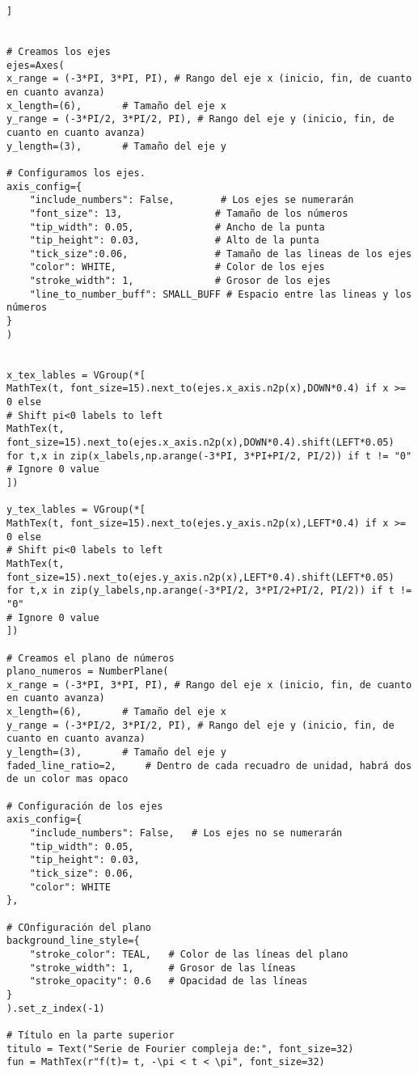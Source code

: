 \begin{longlisting}
\begin{verbatim}
]


# Creamos los ejes
ejes=Axes(
x_range = (-3*PI, 3*PI, PI), # Rango del eje x (inicio, fin, de cuanto en cuanto avanza)
x_length=(6),       # Tamaño del eje x
y_range = (-3*PI/2, 3*PI/2, PI), # Rango del eje y (inicio, fin, de cuanto en cuanto avanza)
y_length=(3),       # Tamaño del eje y

# Configuramos los ejes.
axis_config={
	"include_numbers": False,        # Los ejes se numerarán
	"font_size": 13,                # Tamaño de los números
	"tip_width": 0.05,              # Ancho de la punta
	"tip_height": 0.03,             # Alto de la punta
	"tick_size":0.06,               # Tamaño de las lineas de los ejes
	"color": WHITE,                 # Color de los ejes
	"stroke_width": 1,              # Grosor de los ejes
	"line_to_number_buff": SMALL_BUFF # Espacio entre las lineas y los números
}       
)


x_tex_lables = VGroup(*[
MathTex(t, font_size=15).next_to(ejes.x_axis.n2p(x),DOWN*0.4) if x >= 0 else
# Shift pi<0 labels to left
MathTex(t, font_size=15).next_to(ejes.x_axis.n2p(x),DOWN*0.4).shift(LEFT*0.05)
for t,x in zip(x_labels,np.arange(-3*PI, 3*PI+PI/2, PI/2)) if t != "0"
# Ignore 0 value
])

y_tex_lables = VGroup(*[
MathTex(t, font_size=15).next_to(ejes.y_axis.n2p(x),LEFT*0.4) if x >= 0 else
# Shift pi<0 labels to left
MathTex(t, font_size=15).next_to(ejes.y_axis.n2p(x),LEFT*0.4).shift(LEFT*0.05)
for t,x in zip(y_labels,np.arange(-3*PI/2, 3*PI/2+PI/2, PI/2)) if t != "0"
# Ignore 0 value
])

# Creamos el plano de números
plano_numeros = NumberPlane(
x_range = (-3*PI, 3*PI, PI), # Rango del eje x (inicio, fin, de cuanto en cuanto avanza)
x_length=(6),       # Tamaño del eje x
y_range = (-3*PI/2, 3*PI/2, PI), # Rango del eje y (inicio, fin, de cuanto en cuanto avanza)
y_length=(3),       # Tamaño del eje y
faded_line_ratio=2,     # Dentro de cada recuadro de unidad, habrá dos de un color mas opaco

# Configuración de los ejes
axis_config={
	"include_numbers": False,   # Los ejes no se numerarán
	"tip_width": 0.05, 
	"tip_height": 0.03, 
	"tick_size": 0.06, 
	"color": WHITE
},

# COnfiguración del plano
background_line_style={
	"stroke_color": TEAL,   # Color de las líneas del plano
	"stroke_width": 1,      # Grosor de las líneas
	"stroke_opacity": 0.6   # Opacidad de las líneas
}
).set_z_index(-1)

# Título en la parte superior
titulo = Text("Serie de Fourier compleja de:", font_size=32)
fun = MathTex(r"f(t)= t, -\pi < t < \pi", font_size=32)


\end{verbatim}
\end{longlisting}

